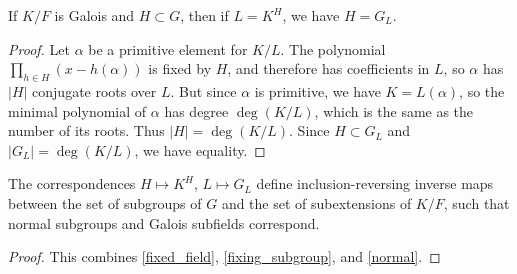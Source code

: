 \begin{corollary}
 If $K/F$ is Galois and $H \subset G$, then if $L = K^H$, we have $H = G_L$.
 \label{fixing_subgroup}
\end{corollary}

\begin{proof}
 Let $\alpha$ be a primitive element for $K/L$.  The polynomial $\prod_{h \in H} (x - h(\alpha))$ is fixed by $H$, and therefore has coefficients in $L$, so $\alpha$ has $|H|$ conjugate roots over $L$.  But since $\alpha$ is primitive, we have $K = L(\alpha)$, so the minimal polynomial of $\alpha$ has degree $\deg(K/L)$, which is the same as the number of its roots.  Thus $|H| = \deg(K/L)$.  Since $H \subset G_L$ and $|G_L| = \deg(K/L)$, we have equality.
\end{proof}


\begin{theorem} The correspondences $H \mapsto K^H$, $L \mapsto G_L$ define
inclusion-reversing inverse maps between the set of subgroups of $G$ and the
set of subextensions of $K/F$, such that normal subgroups and Galois subfields
correspond.
\label{fundamental_theorem}
\end{theorem}

\begin{proof} This combines \ref{fixed_field}, \ref{fixing_subgroup}, and \ref{normal}.
\end{proof}


